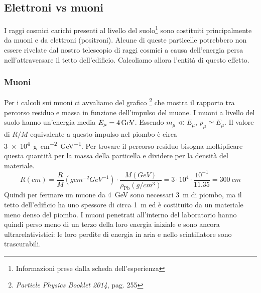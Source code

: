 \subsection{Elettroni vs muoni}  %

I raggi cosmici carichi presenti al livello del suolo\footnote{Informazioni prese dalla scheda dell'esperienza} sono costituiti principalmente da muoni e da elettroni (positroni). Alcune di queste particelle potrebbero non essere rivelate dal nostro telescopio di raggi cosmici a causa dell'energia persa nell'attraversare il tetto dell'edificio. Calcoliamo allora l'entità di questo effetto.
\subsubsection*{Muoni} 
Per i calcoli sui muoni ci avvaliamo del grafico%
\footnote{\emph{Particle Physics Booklet 2014}, pag. 255}
che mostra il rapporto tra percorso residuo e massa in funzione dell'impulso del muone.
I muoni a livello del suolo hanno un'energia media $E_\mu=\SI4{GeV}$. Essendo $m_\mu \ll E_\mu$, $p_\mu \simeq E_\mu$. Il valore di $R/M$ equivalente a questo impulso nel piombo è circa \SI{3e4}{g cm^{-2} GeV^{-1}}. Per trovare il percorso residuo bisogna moltiplicare questa quantità per la massa della particella e dividere per la densità del materiale.
\begin{equation}
R(\si{cm})=\frac{R}{M} (\si{g cm^{-2} GeV^{-1}}) \cdot \frac{M(\si{GeV})}{\rho_{\text{Pb}} (\si{g/cm^3})}=3\cdot10^4 \cdot  \frac{10^{-1} }{11.35}=\SI{300}{cm}    
\end{equation}
Quindi per fermare un muone da \SI{4}{GeV} sono necessari \SI{3}{m} di piombo, ma il tetto dell'edificio ha uno spessore di circa \SI{1}{m}
 ed è costituito da un materiale meno denso del piombo. I muoni penetrati all'interno del laboratorio hanno quindi perso meno di un terzo della loro energia iniziale e sono ancora ultrarelativistici: le loro perdite di energia in aria e nello scintillatore sono trascurabili. 

